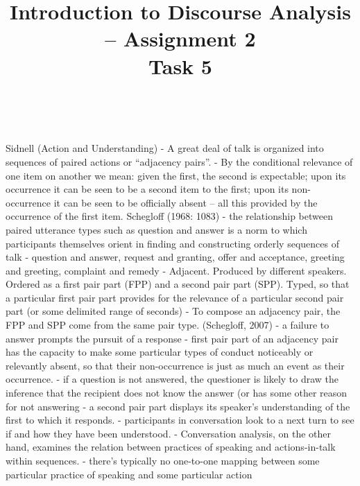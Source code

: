 \documentclass[11pt]{article}
\title{\LARGE Introduction to Discourse Analysis -- Assignment 2 \\ Task 5}
\date{}
\begin{document}
\maketitle

\,
\vspace{-5em}



Sidnell (Action and Understanding)
- A great deal of talk is organized into sequences of paired actions or “adjacency pairs”.
- By the conditional relevance of one item on another we mean: given the first, the second is expectable; upon its occurrence it can be seen to be a second item to the first; upon its non-occurrence it can be seen to be officially absent – all this provided by the occurrence of the first item. Schegloff (1968: 1083)
- the relationship between paired utterance types such as question and answer is a norm to which participants themselves orient in finding and constructing orderly sequences of talk
- question and answer, request and granting, offer and acceptance, greeting and greeting, complaint and remedy
- Adjacent. Produced by different speakers. Ordered as a first pair part (FPP) and a second pair part (SPP). Typed, so that a particular first pair part provides for the relevance of a particular second pair part (or some delimited range of seconds)
- To compose an adjacency pair, the FPP and SPP come from the same pair type. (Schegloff, 2007)
- a failure to answer prompts the pursuit of a response
- first pair part of an adjacency pair has the capacity to make some particular types of conduct noticeably or relevantly absent, so that their non-occurrence is just as much an event as their occurrence.
- if a question is not answered, the questioner is likely to draw the inference that the recipient does not know the answer (or has some other reason for not answering
- a second pair part displays its speaker’s understanding of the first to which it responds.
- participants in conversation look to a next turn to see if and how they have been understood.
- Conversation analysis, on the other hand, examines the relation between practices of speaking and actions-in-talk within sequences.
- there’s typically no one-to-one mapping between some particular practice of speaking and some particular action
\end{document}

